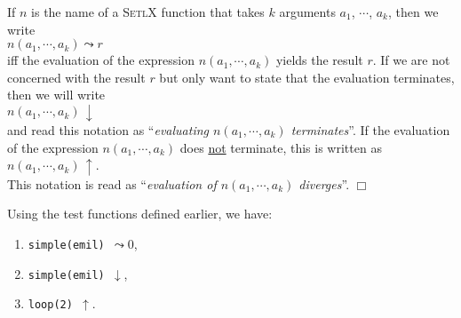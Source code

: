 \begin{Notation}[$\leadsto$, $\downarrow$, $\uparrow$]
If $n$ is the name of a \textsc{SetlX} function that takes $k$ arguments $a_1$, $\cdots$, $a_k$,
then we write 
\\[0.2cm]
\hspace*{1.3cm}
 $n(a_1, \cdots, a_k) \leadsto r$ 
\\[0.2cm]
iff the evaluation of the expression $n(a_1, \cdots, a_k)$ yields the result $r$.  If we are not
concerned with the result $r$ but only want to state that the evaluation terminates,
then we will write
\\[0.2cm]
\hspace*{1.3cm} $n(a_1, \cdots, a_k) \,\downarrow$ \\[0.3cm]
and read this notation as ``\emph{evaluating $n(a_1, \cdots, a_k)$ terminates}''.
If the evaluation of the expression $n(a_1, \cdots, a_k)$ does \underline{not} terminate, this is
written as \\[0.2cm]
\hspace*{1.3cm}
 $n(a_1, \cdots, a_k) \,\uparrow$. 
\\[0.2cm]
This notation is read as ``\emph{evaluation of $n(a_1, \cdots, a_k)$ diverges}''.
\hspace*{\fill} $\Box$
\end{Notation}

\examples  Using the test functions defined earlier, we have:
\begin{enumerate}
\item {\tt simple(emil) $\leadsto 0$},
\item {\tt simple(emil) $\downarrow$},
\item {\tt loop(2) $\uparrow$}.
\end{enumerate}


